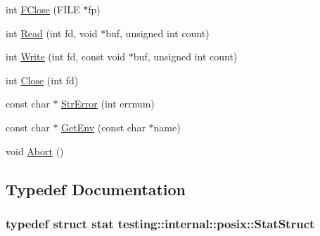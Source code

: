 \begin{DoxyCompactItemize}
\item 
int \hyperlink{namespacetesting_1_1internal_1_1posix_af4beeaaa8d62916d5e3b644a1ddfbd6b}{F\-Close} (F\-I\-L\-E $\ast$fp)
\item 
int \hyperlink{namespacetesting_1_1internal_1_1posix_a3c6ab13e581a56f1b02f3eb7536c97fd}{Read} (int fd, void $\ast$buf, unsigned int count)
\item 
int \hyperlink{namespacetesting_1_1internal_1_1posix_af4acf9f78d55f815a18b43786511abef}{Write} (int fd, const void $\ast$buf, unsigned int count)
\item 
int \hyperlink{namespacetesting_1_1internal_1_1posix_a15e5b8f2a535ef1b2529b85b861e4846}{Close} (int fd)
\item 
const char $\ast$ \hyperlink{namespacetesting_1_1internal_1_1posix_a6e7e77c37cacb64c32234b988b10933c}{Str\-Error} (int errnum)
\item 
const char $\ast$ \hyperlink{namespacetesting_1_1internal_1_1posix_aa78973d3f7aa4efd24742b0537c8cd50}{Get\-Env} (const char $\ast$name)
\item 
void \hyperlink{namespacetesting_1_1internal_1_1posix_a69b8278c59359dd6a6f941b4643db9fb}{Abort} ()
\end{DoxyCompactItemize}


\subsection{Typedef Documentation}
\hypertarget{namespacetesting_1_1internal_1_1posix_a8eb9f08d3af29941c2d2a964cfff3ecb}{
\subsubsection[{Stat\-Struct}]{\setlength{\rightskip}{0pt plus 5cm}typedef struct stat {\bf testing\-::internal\-::posix\-::\-Stat\-Struct}}}\label{namespacetesting_1_1internal_1_1posix_a8eb9f08d3af29941c2d2a964cfff3ecb}


